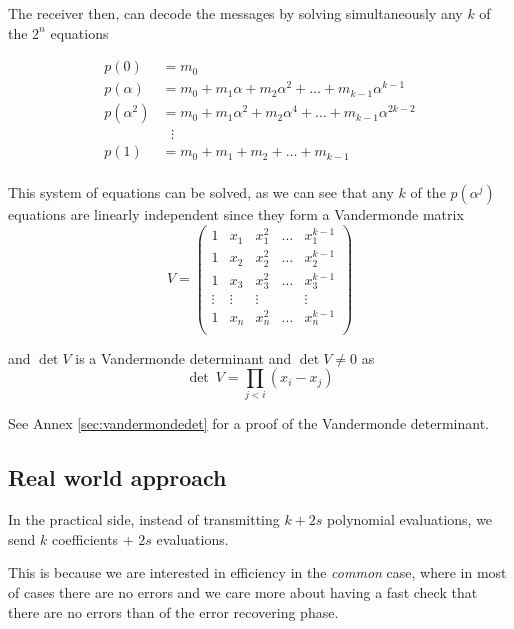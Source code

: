 \documentclass[a4paper]{article}
\theoremstyle{definition}
\begin{document}
The receiver then, can decode the messages by solving simultaneously any $k$ of the $2^n$ equations

\begin{align*}
    p(0) &= m_0\\
    p(\alpha) &= m_0 + m_1 \alpha + m_2 \alpha^2 + \ldots + m_{k-1} \alpha^{k-1}\\
    p(\alpha^2) &= m_0 + m_1 \alpha^2 + m_2 \alpha^4 + \ldots + m_{k-1} \alpha^{2k-2}\\
    &~~~\vdots\\
    p(1) &= m_0 + m_1 + m_2 + \ldots + m_{k-1}\\
\end{align*}

This system of equations can be solved, as we can see that any $k$ of the $p(\alpha^j)$ equations are linearly independent since they form a Vandermonde matrix
$$
V =
\begin{pmatrix}
    1 & x_1 & x_1^2 & \ldots & x_1^{k-1} \\
    1 & x_2 & x_2^2 & \ldots & x_2^{k-1} \\
    1 & x_3 & x_3^2 & \ldots & x_3^{k-1} \\
    \vdots & \vdots & \vdots &  & \vdots\\
    1 & x_n & x_n^2 & \ldots & x_n^{k-1} \\
\end{pmatrix}
$$

and $\det V$ is a Vandermonde determinant and $\det V \neq 0$ as
$$
\det~V = \prod_{j < i} (x_i - x_j)
$$

See Annex \ref{sec:vandermondedet} for a proof of the Vandermonde determinant.



\subsection{Real world approach}
In the practical side, instead of transmitting $k+2s$ polynomial evaluations, we send $k$ coefficients + $2s$ evaluations.

This is because we are interested in efficiency in the \emph{common} case, where in most of cases there are no errors and we care more about having a fast check that there are no errors than of the error recovering phase.
\end{document}
